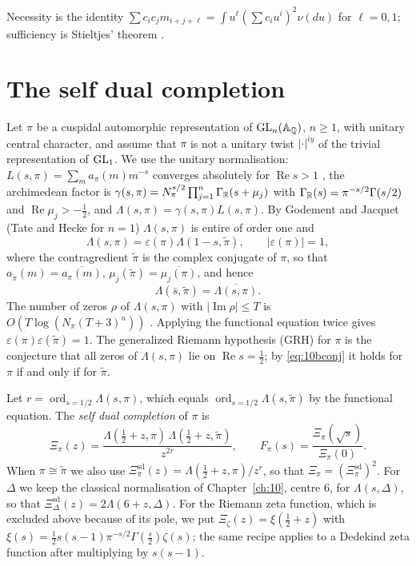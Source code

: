Necessity is the identity $\sum c_ic_jm_{i+j+\ell} = \int u^\ell(\sum c_iu^i)^2\nu(du)$ for $\ell=0,1$; sufficiency is Stieltjes' theorem \cite{stieltjes1894,akhiezer1965}.

\section{The self dual completion}\label{sec:10bcompletion}

Let $\pi$ be a cuspidal automorphic representation of $\mathrm{GL}_n(\mathbb{A}_{\mathbb{Q}})$, $n\ge1$, with unitary central character, and assume that $\pi$ is not a unitary twist $|\cdot|^{iy}$ of the trivial representation of $\mathrm{GL}_1$. We use the unitary normalisation: $L(s,\pi) = \sum_ma_\pi(m)m^{-s}$ converges absolutely for $\operatorname{Re}s>1$ \cite{jacquetshalika1981}, the archimedean factor is $\gamma(s,\pi) = N_\pi^{s/2}\prod_{j=1}^n\Gamma_{\mathbb{R}}(s+\mu_j)$ with $\Gamma_{\mathbb{R}}(s) = \pi^{-s/2}\Gamma(s/2)$ and $\operatorname{Re}\mu_j>-\frac12$, and $\Lambda(s,\pi) = \gamma(s,\pi)L(s,\pi)$. By Godement and Jacquet \cite{godementjacquet1972} (Tate and Hecke for $n=1$) $\Lambda(s,\pi)$ is entire of order one and
\[
\Lambda(s,\pi) = \varepsilon(\pi)\Lambda(1-s,\tilde\pi),\qquad|\varepsilon(\pi)|=1,
\]
where the contragredient $\tilde\pi$ is the complex conjugate of $\pi$, so that $a_{\tilde\pi}(m) = \overline{a_\pi(m)}$, $\mu_j(\tilde\pi) = \overline{\mu_j(\pi)}$, and hence
\begin{equation}\label{eq:10bconj}
\Lambda(\bar s,\tilde\pi) = \overline{\Lambda(s,\pi)} .
\end{equation}
The number of zeros $\rho$ of $\Lambda(s,\pi)$ with $|\operatorname{Im}\rho|\le T$ is $O(T\log(N_\pi(T+3)^n))$ \cite{iwanieckowalski2004}. Applying the functional equation twice gives $\varepsilon(\pi)\varepsilon(\tilde\pi) = 1$. The generalized Riemann hypothesis (GRH) for $\pi$ is the conjecture that all zeros of $\Lambda(s,\pi)$ lie on $\operatorname{Re}s=\frac12$; by \eqref{eq:10bconj} it holds for $\pi$ if and only if for $\tilde\pi$.

\begin{definition}\label{def:10bxi}
Let $r = \operatorname{ord}_{s=1/2}\Lambda(s,\pi)$, which equals $\operatorname{ord}_{s=1/2}\Lambda(s,\tilde\pi)$ by the functional equation. The \emph{self dual completion} of $\pi$ is
\[
\Xi_\pi(z) = \frac{\Lambda(\frac12+z,\pi)\,\Lambda(\frac12+z,\tilde\pi)}{z^{2r}},\qquad F_\pi(s) = \frac{\Xi_\pi(\sqrt s)}{\Xi_\pi(0)} .
\]
When $\pi\cong\tilde\pi$ we also use $\Xi^{\mathrm{sd}}_\pi(z) = \Lambda(\frac12+z,\pi)/z^r$, so that $\Xi_\pi = (\Xi^{\mathrm{sd}}_\pi)^2$. For $\Delta$ we keep the classical normalisation of Chapter~\ref{ch:10}, centre $6$, for $\Lambda(s,\Delta)$, so that $\Xi^{\mathrm{sd}}_\Delta(z) = 2\Lambda(6+z,\Delta)$. For the Riemann zeta function, which is excluded above because of its pole, we put $\Xi_\zeta(z) = \xi(\frac12+z)$ with $\xi(s) = \frac12s(s-1)\pi^{-s/2}\Gamma(\frac s2)\zeta(s)$; the same recipe applies to a Dedekind zeta function after multiplying by $s(s-1)$.
\end{definition}

